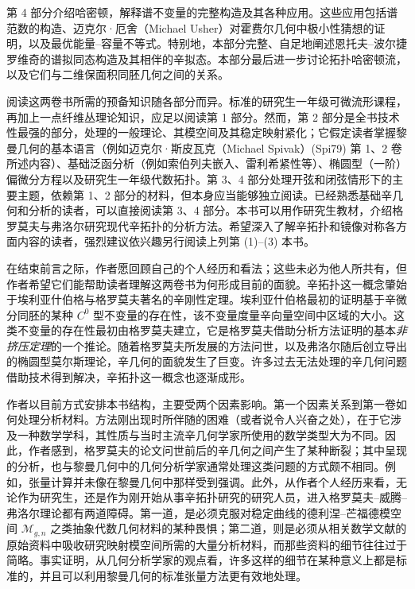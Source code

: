 第 4 部分介绍哈密顿\termFloerHomology{}，解释谱不变量的完整构造及其各种应用。这些应用包括谱范数的构造、迈克尔·厄舍（Michael Usher）对霍费尔几何中极小性猜想的证明，以及最优能量--容量不等式。特别地，本部分完整、自足地阐述恩托夫--波尔捷罗维奇的谱拟同态构造及其相伴的辛拟态。本部分最后进一步讨论拓扑哈密顿流，以及它们与二维保面积同胚几何之间的关系。

阅读这两卷书所需的预备知识随各部分而异。标准的研究生一年级可微流形课程，再加上一点纤维丛理论知识，应足以阅读第 1 部分。然而，第 2 部分是全书技术性最强的部分，处理\termPseudoholomorphicCurve{}的一般理论、其模空间及其稳定映射紧化；它假定读者掌握黎曼几何的基本语言（例如迈克尔·斯皮瓦克（Michael Spivak）(Spi79) 第 1、2 卷所述内容）、基础泛函分析（例如索伯列夫嵌入、雷利希紧性等）、椭圆型（一阶）偏微分方程以及研究生一年级代数拓扑。第 3、4 部分处理开弦和闭弦情形下\termFloerHomology{}的主要主题，依赖第 1、2 部分的材料，但本身应当能够独立阅读。已经熟悉基础辛几何和\termPseudoholomorphicCurve{}分析的读者，可以直接阅读第 3、4 部分。本书可以用作研究生教材，介绍格罗莫夫与弗洛尔研究现代辛拓扑的分析方法。希望深入了解辛拓扑和镜像对称各方面内容的读者，强烈建议依兴趣另行阅读上列第 (1)--(3) 本书。

在结束前言之际，作者愿回顾自己的个人经历和看法；这些未必为他人所共有，但作者希望它们能帮助读者理解这两卷书为何形成目前的面貌。辛拓扑这一概念肇始于埃利亚什伯格与格罗莫夫著名的辛刚性定理。埃利亚什伯格最初的证明基于辛微分同胚的某种 $C^0$ 型不变量的存在性，该不变量度量辛向量空间中区域的大小。这类不变量的存在性最初由格罗莫夫建立，它是格罗莫夫借助\termPseudoholomorphicCurve{}分析方法证明的基本\emph{非挤压定理}的一个推论。随着格罗莫夫所发展的\termPseudoholomorphicCurve{}方法问世，以及弗洛尔随后创立导出\termFloerHomology{}的椭圆型莫尔斯理论，辛几何的面貌发生了巨变。许多过去无法处理的辛几何问题借助\termPseudoholomorphicCurve{}技术得到解决，辛拓扑这一概念也逐渐成形。

作者以目前方式安排本书结构，主要受两个因素影响。第一个因素关系到第一卷如何处理分析材料。\termPseudoholomorphicCurve{}方法刚出现时所伴随的困难（或者说令人兴奋之处），在于它涉及一种数学学科，其性质与当时主流辛几何学家所使用的数学类型大为不同。因此，作者感到，格罗莫夫的论文问世前后的辛几何之间产生了某种断裂；其中呈现的分析，也与黎曼几何中的几何分析学家通常处理这类问题的方式颇不相同。例如，张量计算并未像在黎曼几何中那样受到强调。此外，从作者个人经历来看，无论作为研究生，还是作为刚开始从事辛拓扑研究的研究人员，进入格罗莫夫--威腾--弗洛尔理论都有两道障碍。第一道，是必须克服对稳定曲线的德利涅--芒福德模空间 $\mathcal M_{g,n}$ 之类抽象代数几何材料的某种畏惧；第二道，则是必须从相关数学文献的原始资料中吸收研究\termPseudoholomorphicCurve{}映射模空间所需的大量分析材料，而那些资料的细节往往过于简略。事实证明，从几何分析学家的观点看，许多这样的细节在某种意义上都是标准的，并且可以利用黎曼几何的标准张量方法更有效地处理。

